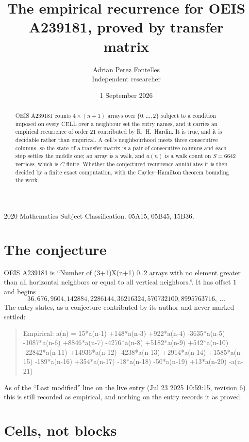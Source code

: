 \documentclass[11pt,a4paper]{article}
\title{The empirical recurrence for OEIS A239181, proved by transfer matrix}
\author{Adrian Perez Fontelles\\ \small Independent researcher}
\date{1 September 2026}
\theoremstyle{plain}
\theoremstyle{definition}
\begin{document}
\maketitle

\begin{abstract}
OEIS A239181 counts $4\times(n+1)$ arrays over $\{0,\dots,2\}$ subject to a condition imposed on
every CELL over a neighbour set the entry names, and it carries an empirical recurrence of
order $21$ contributed by R.~H.~Hardin. It is true, and it is decidable rather than
empirical. A cell's neighbourhood meets three consecutive columns, so the state of a transfer
matrix is a pair of consecutive columns and each step settles the middle one; an array is a
walk, and $a(n)$ is a walk count on $S=6642$ vertices, which is $C$-finite. Whether the
conjectured recurrence annihilates it is then decided by a finite exact computation, with the
Cayley--Hamilton theorem bounding the work.
\end{abstract}

\noindent\small 2020 Mathematics Subject Classification. 05A15, 05B45, 15B36.\normalsize

\section{The conjecture}

OEIS A239181 is ``Number of (3+1)X(n+1) 0..2 arrays with no element greater than all horizontal neighbors or equal to all vertical neighbors.''. It has offset $1$ and begins
\[
36, 676, 9604, 142884, 2286144, 36216324, 570732100, 8995763716,\ \dots
\]
The entry states, as a conjecture contributed by its author and never marked settled:
\begin{quote}
Empirical: a(n) = 15*a(n-1) +148*a(n-3) +922*a(n-4) -3635*a(n-5) -1087*a(n-6) +8846*a(n-7) -4276*a(n-8) +5182*a(n-9) +542*a(n-10) -22842*a(n-11) +14936*a(n-12) -4238*a(n-13) +2914*a(n-14) +1585*a(n-15) -189*a(n-16) +354*a(n-17) -18*a(n-18) -50*a(n-19) +13*a(n-20) -a(n-21)
\end{quote}
As of the ``Last modified'' line on the live entry (Jul 23 2025 10:59:15, revision 6) this is still
recorded as empirical, and nothing on the entry records it as proved.

\section{Cells, not blocks}
\end{document}
